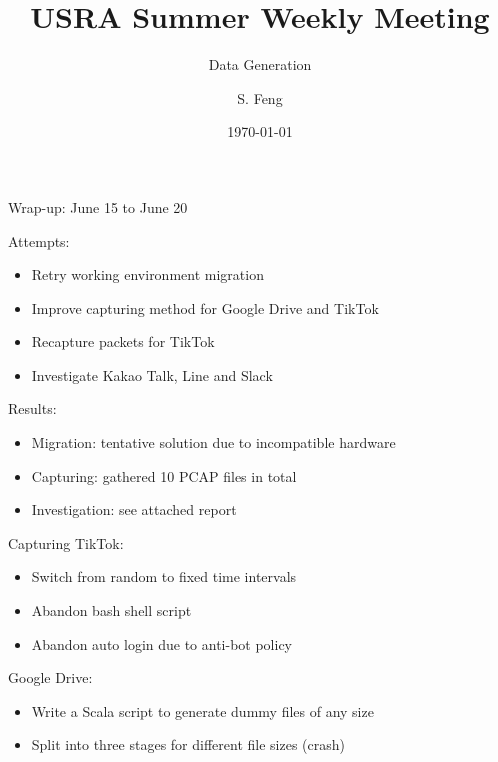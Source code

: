 \documentclass{beamer}
\title[Weekly Meeting]{
    USRA Summer Weekly Meeting
}
\subtitle[]{Data Generation}
\author[Shuo Feng]{S. Feng}
\institute[NIMS Lab]{
  NIMS Lab\\
  USRA Summer 2023}
\date{\today}
\begin{document}
\frame{\titlepage}

\begin{frame}{Wrap-up: June 15 to June 20}

  Attempts:
  \begin{itemize}
    \item Retry working environment migration
    \item Improve capturing method for Google Drive and TikTok
    \item Recapture packets for TikTok
    \item Investigate Kakao Talk, Line and Slack
  \end{itemize}

  Results:
  \begin{itemize}
    \item Migration: tentative solution due to incompatible hardware
    \item Capturing: gathered 10 PCAP files in total
    \item Investigation: see attached report
  \end{itemize}

\end{frame}

\begin{frame}{Capturing}
  TikTok:
  \begin{itemize}
    \item Switch from random to fixed time intervals
    \item Abandon bash shell script
    \item Abandon auto login due to anti-bot policy
  \end{itemize}

  Google Drive:
  \begin{itemize}
    \item Write a Scala script to generate dummy files of any size
    \item Split into three stages for different file sizes (crash)
  \end{itemize}

\end{frame}
\end{document}
